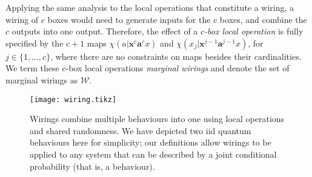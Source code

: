\documentclass[10pt, a4paper]{article}
\numberwithin{equation}{section} %
\theoremstyle{definition}
\theoremstyle{plain}
\newcommand{\dintv}[2]{\mathopen\{#1,\ldots,#2\mathclose\}}
\newcommand{\?}{\mathrel{?}} %
\newcommand{\cvec}[1]{\boldsymbol{\mathbf{#1}}}    %
\newcommand{\sW}{\mathcal{W}}
\begin{document}
              Applying the same analysis to the local operations that constitute a wiring, a wiring of \(c\) boxes would need to generate inputs for the \(c\) boxes, and combine the \(c\) outputs into one output. Therefore, the effect of a \emph{\(c\)-box local operation} is fully specified by the \(c+1\) maps \(\chi(a|\cvec{x}^c\cvec{a}^{c}x)\) and \(\chi(x_j|\cvec{x}^{j-1}\cvec{a}^{j-1}x)\), for \(j \in \dintv{1}{c}\), where there are no constraints on maps besides their cardinalities. We term these \(c\)-box local operations \emph{marginal wirings} and denote the set of marginal wirings as \(\sW\).


              \begin{figure}
                \centering
                \texttt{[image: wiring.tikz]}
                \caption[Causal influences in a wiring between two iid quantum behaviours.]{\label{fig:wiring} Wirings combine multiple behaviours into one using local operations and shared randomness. We have depicted two iid quantum behaviours here for simplicity; our definitions allow wirings to be applied to any system that can be described by a joint conditional probability (that is, a behaviour).}
            \end{figure}
\end{document}
